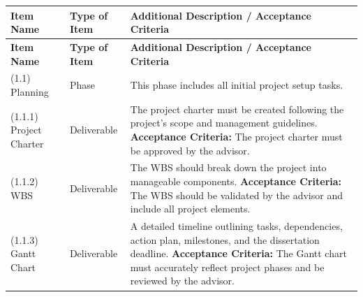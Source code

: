 \begin{longtable}{|p{3cm}|p{2.5cm}|p{8cm}|}
      \hline
      \textbf{Item Name}             & \textbf{Type of Item} & \textbf{Additional Description / Acceptance Criteria}                                                                                                                                                                                                                                                                                                     \\ \hline
      \endfirsthead
      \hline
      \textbf{Item Name}             & \textbf{Type of Item} & \textbf{Additional Description / Acceptance Criteria}                                                                                                                                                                                                                                                                                                     \\ \hline
      \endhead
      (1.1) Planning                 & Phase                 & This phase includes all initial project setup tasks.                                                                                                                                                                                                                                                                                                      \\ \hline
      (1.1.1) Project Charter        & Deliverable           & The project charter must be created following the project's scope and management guidelines. \newline \textbf{Acceptance Criteria:} The project charter must be approved by the advisor.                                                                                                                                                                  \\ \hline
      (1.1.2) \gls{WBS}              & Deliverable           & The \gls{WBS} should break down the project into manageable components. \newline \textbf{Acceptance Criteria:} The WBS should be validated by the advisor and include all project elements.                                                                                                                                                               \\ \hline
      (1.1.3) Gantt Chart            & Deliverable           & A detailed timeline outlining tasks, dependencies, action plan, milestones, and the dissertation deadline. \newline \textbf{Acceptance Criteria:} The Gantt chart must accurately reflect project phases and be reviewed by the advisor.                                                                                                                  \\ \hline
      \hline %


\end{longtable}
